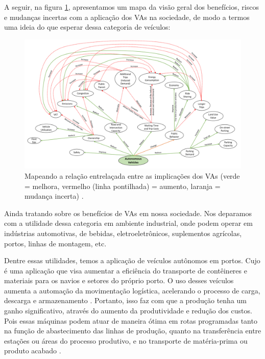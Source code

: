 A seguir, na figura \ref{mapa_resumo}, apresentamos um mapa da visão geral dos benefícios, riscos e mudanças incertas com a aplicação dos VAs na sociedade, de modo a termos uma ideia do que esperar dessa categoria de veículos:

\begin{figure}[H]
\centering
\includegraphics[width=16cm]{Figures/map.png}
\caption{Mapeando a relação entrelaçada entre as implicações dos VAs (verde = melhora, vermelho (linha pontilhada) = aumento, laranja = mudança incerta) \cite{mundobrasil}.}
\label{mapa_resumo}
\end{figure}


 \label{industria}

Ainda tratando sobre os benefícios de VAs em nossa sociedade. Nos deparamos com a utilidade dessa categoria em ambiente industrial, onde podem operar em indústrias automotivas, de bebidas, eletroeletrônicos, suplementos agrícolas, portos, linhas de montagem, etc.

Dentre essas utilidades, temos a aplicação de veículos autônomos em portos. Cujo é uma aplicação que visa aumentar a eficiência do transporte de contêineres e materiais para os navios e setores do próprio porto. O uso desses veículos aumenta a automação da movimentação logística, acelerando o processo de carga, descarga e armazenamento \cite{aplicacao, aplicacao2}.
Portanto, isso faz com que a produção tenha um ganho significativo, através do aumento da produtividade e redução dos custos. Pois essas máquinas podem atuar de maneira ótima em rotas programadas tanto na função de abastecimento das linhas de produção, quanto na transferência entre estações ou áreas do processo produtivo, e no transporte de matéria-prima ou produto acabado \cite{aplicacao}.

